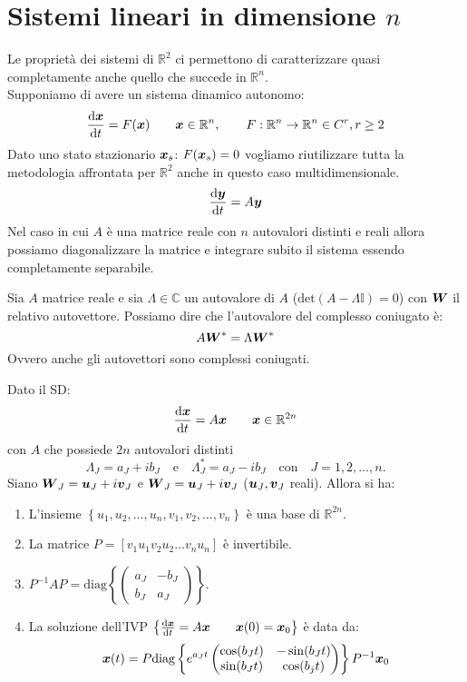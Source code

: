\section{Sistemi lineari in dimensione $n$}%
\label{sub:Sistemi lineari in dimensione n}
Le proprietà dei sistemi di $\mathbb{R}^2$  ci permettono di caratterizzare quasi completamente anche quello che succede in $\mathbb{R}^n$.\\
Supponiamo di avere un sistema dinamico autonomo:
\[
    \frac{\text{d} \boldsymbol{x}}{\text{d} t} = F(\boldsymbol{x}) \qquad \boldsymbol{x}\in \mathbb{R}^n, \qquad F: \mathbb{R}^n \to \mathbb{R}^n \in C^r, r\ge 2
\] 
Dato uno stato stazionario $\boldsymbol{x}_s$: $F(\boldsymbol{x}_s) = 0$ vogliamo riutilizzare tutta la metodologia affrontata per $\mathbb{R}^2$  anche in questo caso multidimensionale.
\[
    \frac{\text{d} \boldsymbol{y}}{\text{d} t} = A \boldsymbol{y}
\] 
Nel caso in cui $A$ è una matrice reale con $n$ autovalori distinti e reali allora possiamo diagonalizzare la matrice e integrare subito il sistema essendo completamente separabile.\\
\begin{thm}[]
    Sia $A$ matrice reale e sia $\Lambda \in \mathbb{C}$ un autovalore di $A$ ($\text{det}(A-\Lambda\mathbb{I})=0$) con $\boldsymbol{W}$ il relativo autovettore. Possiamo dire che l'autovalore del complesso coniugato è:
    \[
        A\boldsymbol{W}^* = \Lambda\boldsymbol{W}^*
    \] 
    Ovvero anche gli autovettori sono complessi coniugati.
\end{thm}
\noindent
\begin{thm}[]
    Dato il SD: 
    \[
        \frac{\text{d} \boldsymbol{x}}{\text{d} t} = A \boldsymbol{x} \qquad \boldsymbol{x}\in \mathbb{R}^{2n}
    \] 
    con $A$ che possiede $2n$ autovalori distinti 
    \[
	\Lambda_J = a_J + i b_J \quad \text{e} \quad \Lambda^*_{J} = a_J - i b_{J} \quad \text{con} \quad J = 1, 2, \ldots, n.
    \] 
    Siano $\boldsymbol{W}_J = \boldsymbol{u}_J + i \boldsymbol{v}_J$ e $\boldsymbol{W}_J = \boldsymbol{u}_J + i \boldsymbol{v}_J$ ($\boldsymbol{u}_J, \boldsymbol{v}_J$ reali). Allora si ha:
    \begin{enumerate}
        \item L'insieme $\left\{u_1,u_2,\ldots, u_n, v_1, v_2, \ldots, v_n\right\}$ è una base di $\mathbb{R}^{2n}$.
	\item La matrice $P = \left[v_1 u_1 v_2 u_2 \ldots v_n u_n\right]$ è invertibile.
	\item $P^{-1}AP = \text{diag}\left\{\begin{pmatrix} a_J & -b_J \\ b_J & a_J \end{pmatrix} \right\}$.
	\item La soluzione dell'IVP $\left\{\frac{\text{d} \boldsymbol{x}}{\text{d} t} = A \boldsymbol{x} \qquad \boldsymbol{x}(0) = \boldsymbol{x}_0\right\}$  è data da:
	    \[
		\boldsymbol{x} (t)=P\text{diag}\left\{e^{a_{J}t}\begin{pmatrix} \cos (b_Jt) & - \sin (b_Jt) \\ \sin (b_Jt) & \cos (b_{j}t) \end{pmatrix} \right\} P^{-1}\boldsymbol{x}_0
	    \] 
    \end{enumerate}
\end{thm}
